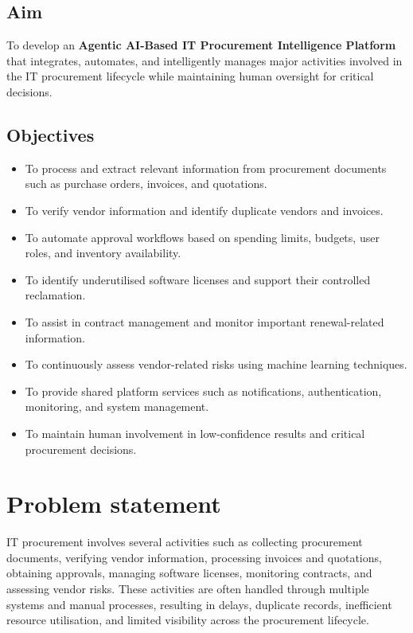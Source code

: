\subsection{Aim}

To develop an \textbf{Agentic AI-Based IT Procurement Intelligence Platform} that integrates, automates, and intelligently manages major activities involved in the IT procurement lifecycle while maintaining human oversight for critical decisions.

\subsection{Objectives}

\begin{itemize}
    \item To process and extract relevant information from procurement documents such as purchase orders, invoices, and quotations.
    
    \item To verify vendor information and identify duplicate vendors and invoices.
    
    \item To automate approval workflows based on spending limits, budgets, user roles, and inventory availability.
    
    \item To identify underutilised software licenses and support their controlled reclamation.
    
    \item To assist in contract management and monitor important renewal-related information.
    
    \item To continuously assess vendor-related risks using machine learning techniques.
    
    \item To provide shared platform services such as notifications, authentication, monitoring, and system management.
    
    \item To maintain human involvement in low-confidence results and critical procurement decisions.
\end{itemize}

\section{Problem statement}


IT procurement involves several activities such as collecting procurement documents, verifying vendor information, processing invoices and quotations, obtaining approvals, managing software licenses, monitoring contracts, and assessing vendor risks. These activities are often handled through multiple systems and manual processes, resulting in delays, duplicate records, inefficient resource utilisation, and limited visibility across the procurement lifecycle.

